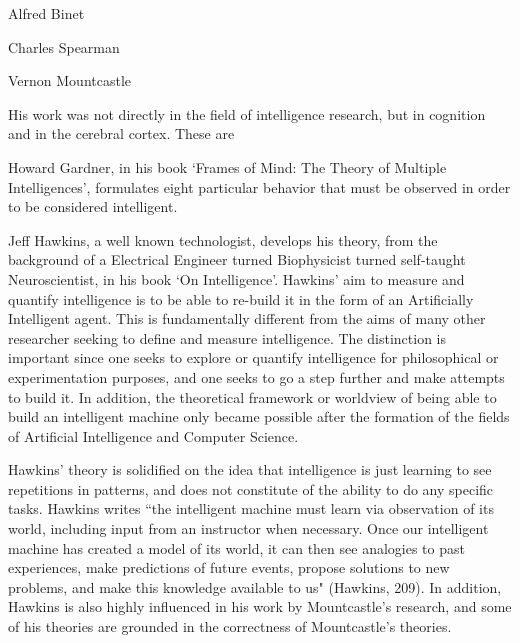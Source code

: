 \documentclass[11pt, oneside]{article}
\begin{document}

\par Alfred Binet


\par Charles Spearman


% 


\par Vernon Mountcastle 
\par His work was not directly in the field of intelligence research, but in cognition and in the cerebral cortex. These are 


\par Howard Gardner, in his book `Frames of Mind: The Theory of Multiple Intelligences', formulates eight particular behavior that must be observed in order to be considered intelligent. 


\par Jeff Hawkins, a well known technologist, develops his theory, from the background of a Electrical Engineer turned Biophysicist turned self-taught Neuroscientist, in his book `On Intelligence'. Hawkins' aim to measure and quantify intelligence is to be able to re-build it in the form of an Artificially Intelligent agent. This is fundamentally different from the aims of many other researcher seeking to define and measure intelligence. The distinction is important since one seeks to explore or quantify intelligence for philosophical or experimentation purposes, and one seeks to go a step further and make attempts to build it. In addition, the theoretical framework or worldview of being able to build an intelligent machine only became possible after the formation of the fields of Artificial Intelligence and Computer Science.

\par Hawkins' theory is solidified on the idea that intelligence is just learning to see repetitions in patterns, and does not constitute of the ability to do any specific tasks. Hawkins writes ``the intelligent machine must learn via observation of its world, including input from an instructor when necessary. Once our intelligent machine has created a model of its world, it can then see analogies to past experiences, make predictions of future events, propose solutions to new problems, and make this knowledge available to us" (Hawkins, 209). In addition, Hawkins is also highly influenced in his work by Mountcastle's research, and some of his theories are grounded in the correctness of Mountcastle's theories.
\end{document}
